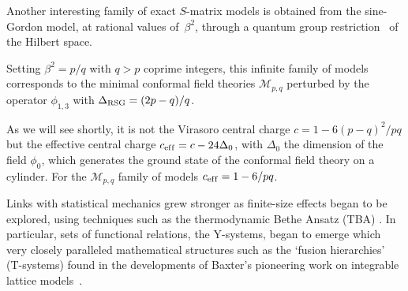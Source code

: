 \documentclass[pdftex]{sigma}
\numberwithin{equation}{section}
\theoremstyle{definition}
\begin{document}
Another interesting   family of exact $S$-matrix models   is
obtained from the sine-Gordon model, at rational values of~$\beta^2$,
through a quantum group restriction~\cite{Smirnov90, Bernard90} of the Hilbert space.


Setting $\beta^2=p/q$ with $q>p$ coprime integers, this inf\/inite family of models corresponds to the
minimal conformal f\/ield theories $\mathcal{M}_{p,q}$  perturbed by  the operator $\phi_{1,3}$ with
$\Delta_{\rm RSG}=(2p-q)/q$.

As we will see shortly,   it is not the Virasoro central charge  $c=1-6(p-q)^2/pq$  but the ef\/fective central charge
$c_{\rm ef\/f}=c-24 \Delta_{0}$, with $\Delta_{0}$ the dimension of the f\/ield $\phi_{0}$, which generates the ground state of the  conformal
f\/ield theory on a cylinder.  For the  $\mathcal{M}_{p,q}$ family  of models  $c_{\rm ef\/f}=1-6/pq$.


Links with statistical mechanics grew stronger as f\/inite-size ef\/fects
began to be explored, using techniques such as the thermodynamic Bethe
Ansatz (TBA) \cite{Zamolodchikov90}.
In particular, sets of functional relations,
the  Y-systems, began to emerge \cite{Zamolodchikov91} which very closely
paralleled mathe\-ma\-ti\-cal structures such as the `fusion hierarchies' (T-systems)
found in the developments of Baxter's pioneering work on integrable
lattice models~\cite{Kuniba94a}.
\end{document}
